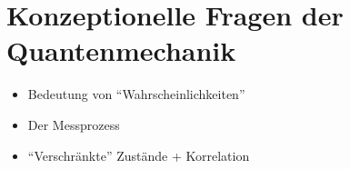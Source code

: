 \documentclass[ngerman, paper=a4, 12pt]{scrartcl}
\begin{document}
\tableofcontents
\newpage
\setcounter{section}{-1}
	
%	
%	
%	
%	
%	
%	
%	
%	
%	
%	
%	
%	 
%	
%	
%	
%	
%	 
%	
%	
%	
%	
%	
%	
%	
%	
%	
%	
%	
%	
%	
%	
%	
	\section{Konzeptionelle Fragen der Quantenmechanik} 
	\begin{itemize}
		\item Bedeutung von ``Wahrscheinlichkeiten''
		\item Der Messprozess
		\item ``Verschränkte'' Zustände + Korrelation
	\end{itemize}
	
	
	
	
	
\end{document}
